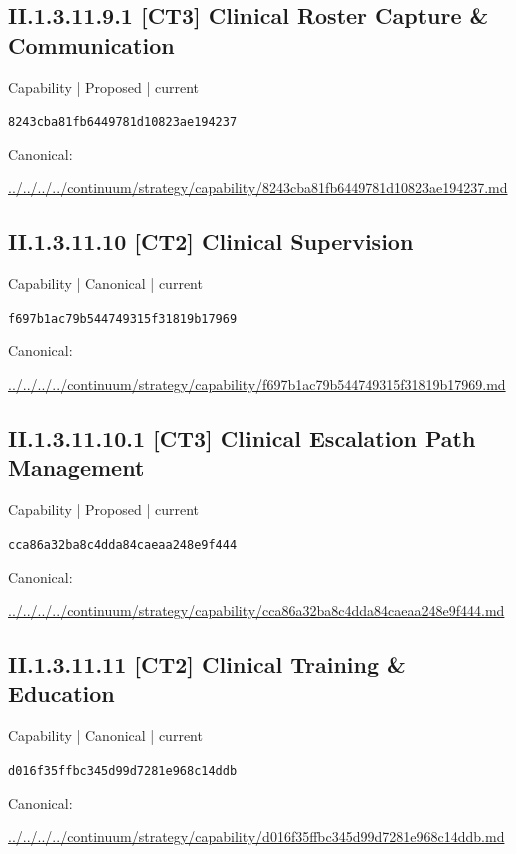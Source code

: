 \documentclass[10pt,a4paper]{article}
\begin{document}
\subsection*{II.1.3.11.9.1 [CT3] Clinical Roster Capture \& Communication}
{\small Capability | Proposed | current}\par
\texttt{8243cba81fb6449781d10823ae194237}\par
Canonical: \par
{\footnotesize\url{../../../../continuum/strategy/capability/8243cba81fb6449781d10823ae194237.md}}\par
\subsection*{II.1.3.11.10 [CT2] Clinical Supervision}
{\small Capability | Canonical | current}\par
\texttt{f697b1ac79b544749315f31819b17969}\par
Canonical: \par
{\footnotesize\url{../../../../continuum/strategy/capability/f697b1ac79b544749315f31819b17969.md}}\par
\subsection*{II.1.3.11.10.1 [CT3] Clinical Escalation Path Management}
{\small Capability | Proposed | current}\par
\texttt{cca86a32ba8c4dda84caeaa248e9f444}\par
Canonical: \par
{\footnotesize\url{../../../../continuum/strategy/capability/cca86a32ba8c4dda84caeaa248e9f444.md}}\par
\subsection*{II.1.3.11.11 [CT2] Clinical Training \& Education}
{\small Capability | Canonical | current}\par
\texttt{d016f35ffbc345d99d7281e968c14ddb}\par
Canonical: \par
{\footnotesize\url{../../../../continuum/strategy/capability/d016f35ffbc345d99d7281e968c14ddb.md}}\par
\end{document}
